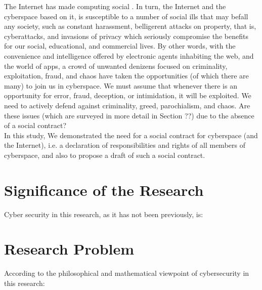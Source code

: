 The Internet has made computing social  \cite{parameswaran2007social}. In turn, the Internet and the cyberspace based on it, is susceptible to a number of social ills that may befall any society, such as constant harassment, belligerent attacks on property, that is, cyberattacks, and invasions of privacy which seriously compromise the benefits for our social, educational, and commercial lives. By other words, with the convenience and intelligence offered by electronic agents inhabiting the web, and the world of apps, a crowd of unwanted denizens focused on criminality, exploitation, fraud, and chaos have taken the opportunities (of which there are many) to join us in cyberspace.  We must assume that whenever there is an opportunity for error, fraud, deception, or intimidation, it will be exploited. We need to actively defend against criminality, greed, parochialism, and chaos. Are these issues (which are surveyed in more detail in Section ??) due to the absence of a social contract? \\ In this study, We demonstrated the need for a social contract for cyberspace (and the Internet), i.e. a declaration of responsibilities and rights of all members of cyberspace, and also to propose a draft of such a social contract.
\fi

\section{Significance of the Research}

Cyber security in this research, as it has not been previously, is:


\section{Research Problem}
According to the philosophical and mathematical viewpoint of cybersecurity in this research:

